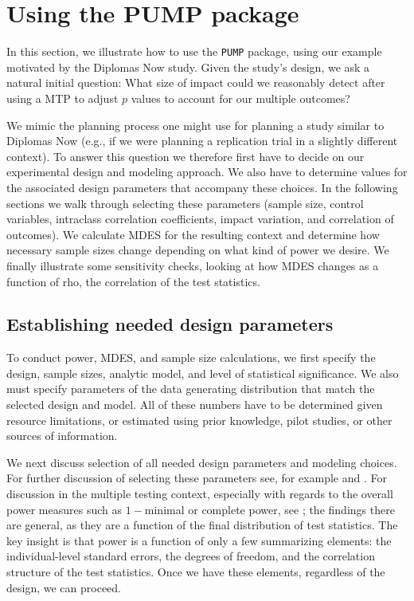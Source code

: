 \documentclass[
]{jss}
\begin{document}
\section{Using the PUMP package}
\label{sec:vignette}

In this section, we illustrate how to use the \texttt{PUMP} package,
using our example motivated by the Diplomas Now study. Given the study's
design, we ask a natural initial question: What size of impact could we
reasonably detect after using a MTP to adjust \(p\) values to account
for our multiple outcomes?

We mimic the planning process one might use for planning a study similar
to Diplomas Now (e.g., if we were planning a replication trial in a
slightly different context). To answer this question we therefore first
have to decide on our experimental design and modeling approach. We also
have to determine values for the associated design parameters that
accompany these choices. In the following sections we walk through
selecting these parameters (sample size, control variables, intraclass
correlation coefficients, impact variation, and correlation of
outcomes). We calculate MDES for the resulting context and determine how
necessary sample sizes change depending on what kind of power we desire.
We finally illustrate some sensitivity checks, looking at how MDES
changes as a function of rho, the correlation of the test statistics.

\subsection{Establishing needed design parameters}

To conduct power, MDES, and sample size calculations, we first specify
the design, sample sizes, analytic model, and level of statistical
significance. We also must specify parameters of the data generating
distribution that match the selected design and model. All of these
numbers have to be determined given resource limitations, or estimated
using prior knowledge, pilot studies, or other sources of information.

We next discuss selection of all needed design parameters and modeling
choices. For further discussion of selecting these parameters see, for
example \citet{RN27978} and \citet{RN4473}. For discussion in the
multiple testing context, especially with regards to the overall power
measures such as \(1-\)minimal or complete power, see
\citet{Porter2018}; the findings there are general, as they are a
function of the final distribution of test statistics. The key insight
is that power is a function of only a few summarizing elements: the
individual-level standard errors, the degrees of freedom, and the
correlation structure of the test statistics. Once we have these
elements, regardless of the design, we can proceed.
\end{document}

